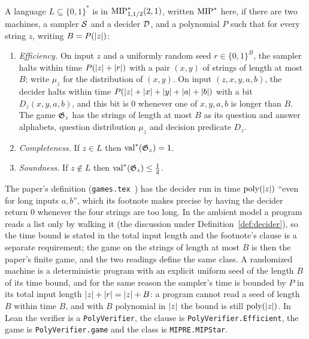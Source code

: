 \begin{definition}
\label{def:mipstar}
\leanok
A language $L\subseteq\{0,1\}^*$ is in $\mathrm{MIP}^*_{1,1/2}(2,1)$, written $\mathrm{MIP}^*$ here, if
there are two machines, a sampler $\mathcal{S}$ and a decider $\mathcal{D}$, and a polynomial $P$
such that for every string $z$, writing $B = P(\left\vert {z} \right\vert)$:
\begin{enumerate}
\item \emph{Efficiency.} On input $z$ and a uniformly random seed $r\in\{0,1\}^B$, the
  sampler halts within time $P(\left\vert {z} \right\vert+\left\vert {r} \right\vert)$ with a pair $(x,y)$ of strings of length at
  most $B$; write $\mu_z$ for the distribution of $(x,y)$. On input $(z,x,y,a,b)$, the decider halts within
  time $P(\left\vert {z} \right\vert+\left\vert {x} \right\vert+\left\vert {y} \right\vert+\left\vert {a} \right\vert+\left\vert {b} \right\vert)$ with a bit $D_z(x,y,a,b)$, and this bit
  is $0$ whenever one of $x,y,a,b$ is longer than $B$. The game $\mathfrak{G}_z$ has the strings of
  length at most $B$ as its question and answer alphabets, question distribution $\mu_z$ and
  decision predicate $D_z$.
\item \emph{Completeness.} If $z\in L$ then $\mathrm{val}^*(\mathfrak{G}_z)=1$.
\item \emph{Soundness.} If $z\notin L$ then $\mathrm{val}^*(\mathfrak{G}_z)\leq\tfrac12$.
\end{enumerate}
\end{definition}

The paper's definition (\texttt{games.tex}~\cite{AuditSync26}) has the decider run in time
$\mathrm{poly}(\left\vert {z} \right\vert)$ ``even for long inputs $a,b$'', which its footnote makes precise by having the
decider return $0$ whenever the four strings are too long. In the ambient model a program
reads a list only by walking it (the discussion under Definition~\ref{def:decider}), so the
time bound is stated in the total input length and the footnote's clause is a separate
requirement; the game on the strings of length at most $B$ is then the paper's finite game, and
the two readings define the same class. A randomized machine is a deterministic program with an
explicit uniform seed of the length $B$ of its time bound, and for the same reason the sampler's
time is bounded by $P$ in its total input length $\left\vert {z} \right\vert + \left\vert {r} \right\vert = \left\vert {z} \right\vert + B$: a
program cannot read a seed of length $B$ within time $B$, and with $B$ polynomial in $\left\vert {z} \right\vert$
the bound is still $\mathrm{poly}(\left\vert {z} \right\vert)$. In Lean the verifier is a
\texttt{PolyVerifier}, the clause is \texttt{PolyVerifier.Efficient}, the game is
\texttt{PolyVerifier.game} and the class is \texttt{MIPRE.MIPStar}.

